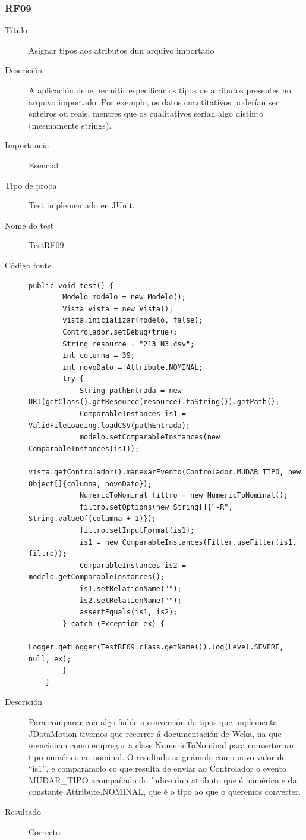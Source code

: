 \subsubsection*{RF09}
\begin{description}
\item[Título] \hfill
Asignar tipos aos atributos dun arquivo importado
\item[Descrición] \hfill
A aplicación debe permitir especificar os tipos de atributos presentes no arquivo importado. Por exemplo, os datos cuantitativos poderían ser enteiros ou reais, mentres que os cualitativos serían algo distinto (mesmamente strings).
\item[Importancia] \hfill
Esencial
\item[Tipo de proba] \hfill
Test implementado en JUnit.
\item[Nome do test] \hfill
TestRF09
\item[Código fonte]
\begin{lstlisting}
public void test() {
        Modelo modelo = new Modelo();
        Vista vista = new Vista();
        vista.inicializar(modelo, false);
        Controlador.setDebug(true);
        String resource = "213_N3.csv";
        int columna = 39;
        int novoDato = Attribute.NOMINAL;
        try {
            String pathEntrada = new URI(getClass().getResource(resource).toString()).getPath();
            ComparableInstances is1 = ValidFileLoading.loadCSV(pathEntrada);
            modelo.setComparableInstances(new ComparableInstances(is1));
            vista.getControlador().manexarEvento(Controlador.MUDAR_TIPO, new Object[]{columna, novoDato});
            NumericToNominal filtro = new NumericToNominal();
            filtro.setOptions(new String[]{"-R", String.valueOf(columna + 1)});
            filtro.setInputFormat(is1);
            is1 = new ComparableInstances(Filter.useFilter(is1, filtro));
            ComparableInstances is2 = modelo.getComparableInstances();
            is1.setRelationName("");
            is2.setRelationName("");
            assertEquals(is1, is2);
        } catch (Exception ex) {
            Logger.getLogger(TestRF09.class.getName()).log(Level.SEVERE, null, ex);
        }
    }
\end{lstlisting}
\item[Descrición]
Para comparar con algo fiable a conversión de tipos que implementa JDataMotion tivemos que recorrer á documentación de Weka, na que mencionan como empregar a clase NumericToNominal para converter un tipo numérico en nominal. O resultado asignámolo como novo valor de ``is1'', e comparámolo co que resulta de enviar ao Controlador o evento MUDAR\_TIPO acompañado do índice dun atributo que é numérico e da constante Attribute.NOMINAL, que é o tipo ao que o queremos converter.
\item[Resultado]
Correcto.
\end{description}

